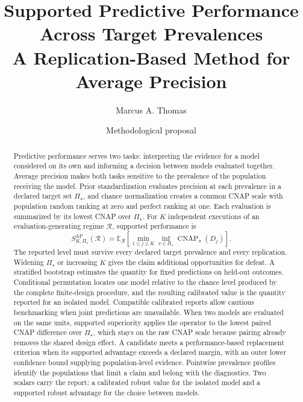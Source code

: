 \documentclass[11pt]{article}
\title{Supported Predictive Performance Across Target Prevalences\\
\large A Replication-Based Method for Average Precision}
\author{Marcus A. Thomas}
\date{Methodological proposal}
\newcommand{\CNAP}{\operatorname{CNAP}}
\newcommand{\Regime}{\mathcal{R}}
\newcommand{\PSet}{\Pi_\star}
\newcommand{\E}{\mathbb{E}}
\theoremstyle{remark}
\begin{document}
\maketitle

\begin{abstract}
Predictive performance serves two tasks: interpreting the evidence for a model considered on its own and informing a decision between models evaluated together. Average precision makes both tasks sensitive to the prevalence of the population receiving the model. Prior standardization evaluates precision at each prevalence in a declared target set $\PSet$, and chance normalization creates a common CNAP scale with population random ranking at zero and perfect ranking at one. Each evaluation is summarized by its lowest CNAP over $\PSet$. For $K$ independent executions of an evaluation-generating regime $\Regime$, supported performance is
\[
S_{K,\PSet}^{\mathrm{AP}}(\Regime)
=
\E_{\Regime}
\left[
\min_{1\leq j\leq K}
\inf_{\pi\in\PSet}\CNAP_\pi(D_j)
\right].
\]
The reported level must survive every declared target prevalence and every replication. Widening $\PSet$ or increasing $K$ gives the claim additional opportunities for defeat. A stratified bootstrap estimates the quantity for fixed predictions on held-out outcomes. Conditional permutation locates one model relative to the chance level produced by the complete finite-design procedure, and the resulting calibrated value is the quantity reported for an isolated model. Compatible calibrated reports allow cautious benchmarking when joint predictions are unavailable. When two models are evaluated on the same units, supported superiority applies the operator to the lowest paired CNAP difference over $\PSet$, which stays on the raw CNAP scale because pairing already removes the shared design effect. A candidate meets a performance-based replacement criterion when its supported advantage exceeds a declared margin, with an outer lower confidence bound supplying population-level evidence. Pointwise prevalence profiles identify the populations that limit a claim and belong with the diagnostics. Two scalars carry the report: a calibrated robust value for the isolated model and a supported robust advantage for the choice between models.
\end{abstract}

\begingroup
\small
\setlength{\parskip}{0pt}
\tableofcontents
\endgroup
\end{document}
